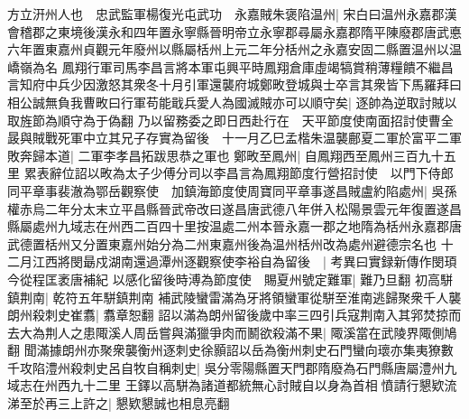 方立汧州人也　忠武監軍楊復光屯武功　永嘉賊朱褒陷温州|{
	宋白曰温州永嘉郡漢會稽郡之東境後漢永和四年置永寧縣晉明帝立永寧郡尋屬永嘉郡隋平陳廢郡唐武悳六年置東嘉州貞觀元年廢州以縣屬栝州上元二年分栝州之永嘉安固二縣置温州以温嶠嶺為名}
鳳翔行軍司馬李昌言將本軍屯興平時鳳翔倉庫虛竭犒賞稍薄糧饋不繼昌言知府中兵少因激怒其衆冬十月引軍還襲府城鄭畋登城與士卒言其衆皆下馬羅拜曰相公誠無負我曹畋曰行軍苟能戢兵愛人為國滅賊亦可以順守矣|{
	逐帥為逆取討賊以取旌節為順守為于偽翻}
乃以留務委之即日西赴行在　天平節度使南面招討使曹全晸與賊戰死軍中立其兄子存實為留後　十一月乙巳孟楷朱温襲鄜夏二軍於富平二軍敗奔歸本道|{
	二軍李孝昌拓跋思恭之軍也}
鄭畋至鳳州|{
	自鳳翔西至鳳州三百九十五里}
累表辭位詔以畋為太子少傅分司以李昌言為鳳翔節度行營招討使　以門下侍郎同平章事裴澈為鄂岳觀察使　加鎮海節度使周寶同平章事遂昌賊盧約陷處州|{
	吳孫權赤烏二年分太末立平昌縣晉武帝改曰遂昌唐武德八年併入松陽景雲元年復置遂昌縣屬處州九域志在州西二百四十里按温處二州本晉永嘉一郡之地隋為栝州永嘉郡唐武德置栝州又分置東嘉州始分為二州東嘉州後為温州栝州改為處州避德宗名也}
十二月江西將閔朂戍湖南還過潭州逐觀察使李裕自為留後　|{
	考異曰實録新傳作閔頊今從程匡袤唐補紀}
以感化留後時溥為節度使　賜夏州號定難軍|{
	難乃旦翻}
初高駢鎮荆南|{
	乾符五年駢鎮荆南}
補武陵蠻雷滿為牙將領蠻軍從駢至淮南逃歸聚衆千人襲朗州殺刺史崔翥|{
	翥章恕翻}
詔以滿為朗州留後歲中率三四引兵寇荆南入其郛焚掠而去大為荆人之患陬溪人周岳嘗與滿獵爭肉而鬭欲殺滿不果|{
	陬溪當在武陵界陬側鳩翻}
聞滿據朗州亦聚衆襲衡州逐刺史徐顥詔以岳為衡州刺史石門蠻向瓌亦集夷獠數千攻陷澧州殺刺史呂自牧自稱刺史|{
	吳分零陽縣置天門郡隋廢為石門縣唐屬澧州九域志在州西九十二里}
王鐸以高駢為諸道都統無心討賊自以身為首相憤請行懇欵流涕至於再三上許之|{
	懇欵懇誠也相息亮翻}


